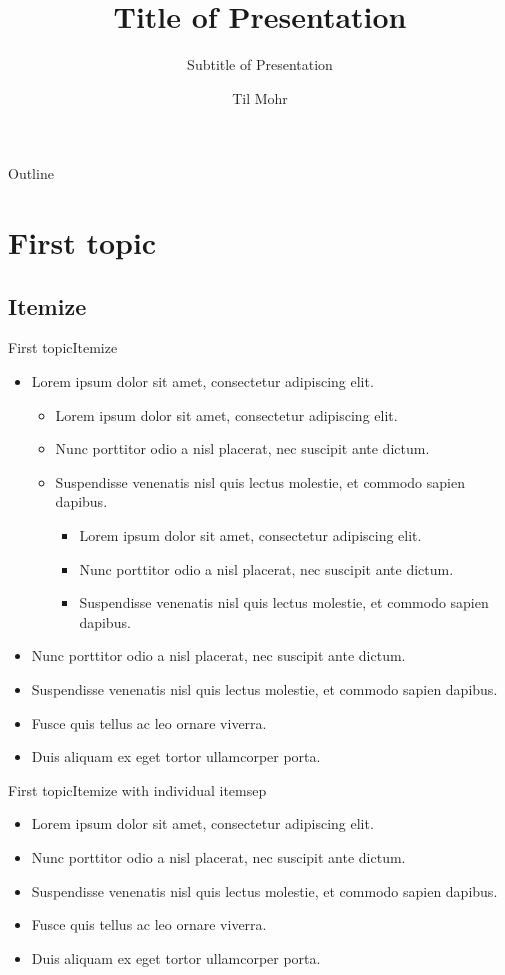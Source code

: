 \documentclass[aspectratio=169]{beamer}
\title{Title of Presentation}
\subtitle{Subtitle of Presentation}
\author{Til Mohr}
\institute{IT Center}
\begin{document}
\begin{frame}[plain]
\titlepage
\end{frame}

\begin{frame}{Outline}
\tableofcontents
\end{frame}

\section{First topic}
\subsection{Itemize}
\begin{frame}{First topic}{Itemize}

\begin{itemize}
	\item Lorem ipsum dolor sit amet, consectetur adipiscing elit.
	\begin{itemize}
		\item Lorem ipsum dolor sit amet, consectetur adipiscing elit.
		\item Nunc porttitor odio a nisl placerat, nec suscipit ante dictum.
		\item Suspendisse venenatis nisl quis lectus molestie, et commodo sapien dapibus.
		\begin{itemize}
			\item Lorem ipsum dolor sit amet, consectetur adipiscing elit.
			\item Nunc porttitor odio a nisl placerat, nec suscipit ante dictum.
			\item Suspendisse venenatis nisl quis lectus molestie, et commodo sapien dapibus.
		\end{itemize}
	\end{itemize}
	\item Nunc porttitor odio a nisl placerat, nec suscipit ante dictum.
	\item Suspendisse venenatis nisl quis lectus molestie, et commodo sapien dapibus.
	\item Fusce quis tellus ac leo ornare viverra.
	\item Duis aliquam ex eget tortor ullamcorper porta.
\end{itemize}
\end{frame}

\begin{frame}[itemsep=1.25\baselineskip]{First topic}{Itemize with individual itemsep}
\begin{itemize}
	\item Lorem ipsum dolor sit amet, consectetur adipiscing elit.
	\item Nunc porttitor odio a nisl placerat, nec suscipit ante dictum.
	\item Suspendisse venenatis nisl quis lectus molestie, et commodo sapien dapibus.
	\item Fusce quis tellus ac leo ornare viverra.
	\item Duis aliquam ex eget tortor ullamcorper porta.
\end{itemize}
\end{frame}
\end{document}
